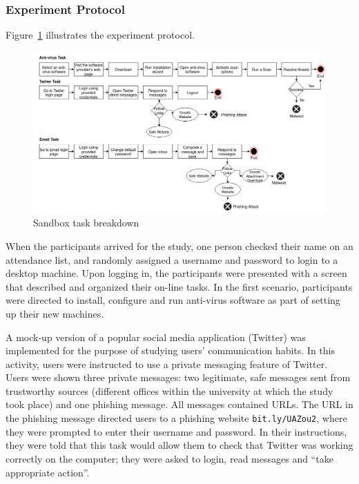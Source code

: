 \documentclass[doctor]{thesis} %
\theoremstyle{plain}
\begin{document}
\subsubsection*{Experiment Protocol}
Figure~\ref{fig:tasks} illustrates the experiment protocol.
\begin{figure}[ht]
  \centering
\includegraphics[width=1.1\columnwidth, keepaspectratio=true]{img/tasks.png}
  \caption{Sandbox task breakdown}
  \label{fig:tasks}
\end{figure}
When the participants arrived for the study, one person checked their name on an attendance list, and randomly assigned a username and password to login to a desktop machine. Upon logging in, the participants were presented with a screen that described and organized their on-line tasks.  In the first scenario, participants were directed to install, configure and run anti-virus software as part of setting up their new machines.  

A mock-up version of a popular social media application (Twitter) was implemented for the purpose of studying users' communication habits. In this activity, users were instructed to use a private messaging feature of Twitter. Users were shown three private messages: two legitimate, safe messages sent from trustworthy sources (different offices within the university at which the study took place) and one phishing message. All messages contained URLs. The URL in the phishing message directed users to a phishing website \texttt{bit.ly/UAZou2}, where they were prompted to enter their username and password. In their instructions, they were told that this task would allow them to check that Twitter was working correctly on the computer; they were asked to login, read messages and ``take appropriate action''.
\end{document}
